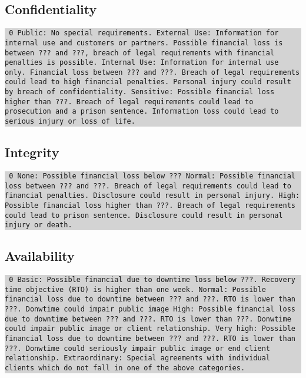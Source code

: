\documentclass[a4paper,10pt]{book}
\begin{document}
\subsection{Confidentiality}
\colorbox{lightgray}{\parbox{\textwidth}{
{\tt
0 Public: No special requirements.
\newline{} External Use: Information for internal use and customers or partners.
Possible financial loss is between ??? and ???, breach of legal requirements
with financial penalties is possible.
\newline{} Internal Use: Information for internal use only. Financial loss between ???
and ???. Breach of legal requirements could lead to high financial penalties.
Personal injury could result by breach of confidentiality.
\newline{} Sensitive: Possible financial loss higher than ???. Breach of legal
requirements could lead to prosecution and a prison sentence. Information loss
could lead to serious injury or loss of life.}
}}

\subsection{Integrity}
\colorbox{lightgray}{\parbox{\textwidth}{
{\tt
0 None: Possible financial loss below ???
\newline{} Normal: Possible financial loss between ??? and ???. Breach of legal
requirements could lead to financial penalties. Disclosure could result in
personal injury.
\newline{} High: Possible financial loss higher than ???. Breach of legal requirements
could lead to prison sentence. Disclosure could result in personal injury or
death.}
}}

\subsection{Availability}
\colorbox{lightgray}{\parbox{\textwidth}{
{\tt
0 Basic: Possible financial due to downtime loss below ???. Recovery time
objective (RTO) is higher than one week.
\newline{} Normal: Possible financial loss due to downtime  between ??? and ???. RTO is
lower than ???. Donwtime could impair public image
\newline{} High: Possible financial loss due to downtime  between ??? and ???. RTO is
lower than ???. Donwtime could impair public image or client relationship.
\newline{} Very high: Possible financial loss due to downtime  between ??? and ???. RTO
is lower than ???. Donwtime could seriously impair public image or end client
relationship.
\newline{} Extraordinary: Special agreements with individual clients which do not fall
in one of the above categories.}
}}
\end{document}
